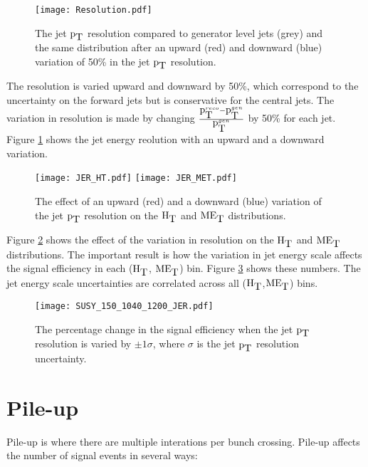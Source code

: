 \begin{figure}
\begin{center}
\texttt{[image: Resolution.pdf]}
\end{center}
\caption{The jet $\mbox{p}_{\mbox{T}}$ resolution compared to generator level jets (grey) and
the same distribution after an upward (red) and downward (blue) 
variation of 50\% in the jet $\mbox{p}_{\mbox{T}}$ resolution.}
\label{fig:Resolution}
\end{figure}

The resolution is varied upward and downward by 50\%, which correspond to the 
uncertainty on the forward jets but is conservative for the central jets. The
variation in resolution is made by changing $\frac{\mbox{p}_{\mbox{T}}^{reco} -
\mbox{p}_{\mbox{T}}^{gen}}{\mbox{p}_{\mbox{T}}^{gen}}$ by 50\% for each jet. Figure \ref{fig:Resolution}
shows the jet energy reolution with an upward and a downward variation. \\

\begin{figure}
\texttt{[image: JER\_HT.pdf]}
\texttt{[image: JER\_MET.pdf]}
\caption{The effect of an upward (red) and a downward (blue) variation
of the jet $\mbox{p}_{\mbox{T}}$ resolution on the $\mbox{H}_{\mbox{T}}$ and $\mbox{ME}_{\mbox{T}}$ distributions.}
\label{fig:JER}
\end{figure}

Figure \ref{fig:JER} shows the effect of the variation in resolution on the
$\mbox{H}_{\mbox{T}}$ and $\mbox{ME}_{\mbox{T}}$ distributions. The important result is how the variation in jet
energy scale affects the signal efficiency in each ($\mbox{H}_{\mbox{T}}$, $\mbox{ME}_{\mbox{T}}$) bin. Figure 
\ref{fig:JER_Numbers} shows these numbers. The jet energy scale uncertainties 
are correlated across all ($\mbox{H}_{\mbox{T}}$,$\mbox{ME}_{\mbox{T}}$) bins.

\begin{figure}
\begin{center}
\texttt{[image: SUSY\_150\_1040\_1200\_JER.pdf]}
\end{center}
\caption{The percentage change in the signal efficiency when the jet $\mbox{p}_{\mbox{T}}$
resolution is varied by $\pm1\sigma$, where $\sigma$ is the jet $\mbox{p}_{\mbox{T}}$ resolution 
uncertainty.}
\label{fig:JER_Numbers}
\end{figure}

\section{Pile-up}

Pile-up is where there are multiple interations per bunch crossing. 
Pile-up affects the number of signal events in several ways:


